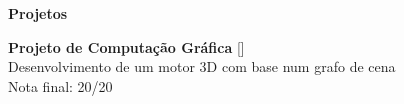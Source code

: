 \noindent\textbf{Projetos}
\noindent\hrulefill
\vspace{0.25em}
\begin{adjustwidth}{1.5em}{0em}
\textbf{Projeto de Computação Gráfica} \hfill [\href{https://github.com/a104437ana/CG}{\faGithub}] \\
Desenvolvimento de um motor 3D com base num grafo de cena\\
Nota final: 20/20
\end{adjustwidth}
\vspace{0.25em}